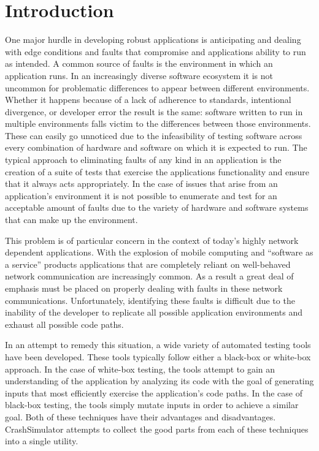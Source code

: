 \section{Introduction}

    One major hurdle in developing robust applications is anticipating and dealing with edge conditions and faults that
    compromise and applications ability to run as intended. A common source of faults is the environment in which an
    application runs. In an increasingly diverse software ecosystem it is not uncommon for problematic differences to
    appear between different environments. Whether it happens because of a lack of adherence to standards, intentional
    divergence, or developer error the result is the same: software written to run in multiple environments falls victim
    to the differences between those environments. These can easily go unnoticed due to the infeasibility of testing
    software across every combination of hardware and software on which it is expected to run. The typical approach to
    eliminating faults of any kind in an application is the creation of a suite of tests that exercise the applications
    functionality and ensure that it always acts appropriately. In the case of issues that arise from an application's
    environment it is not possible to enumerate and test for an acceptable amount of faults due to the variety of
    hardware and software systems that can make up the environment.

    This problem is of particular concern in the context of today's highly network dependent applications. With the
    explosion of mobile computing and ``software as a service'' products applications that are completely reliant on
    well-behaved network communication are increasingly common. As a result a great deal of emphasis must be placed on
    properly dealing with faults in these network communications. Unfortunately, identifying these faults is difficult
    due to the inability of the developer to replicate all possible application environments and exhaust all possible
    code paths.

    In an attempt to remedy this situation, a wide variety of automated testing tools have been developed. These tools
    typically follow either a black-box or white-box approach. In the case of white-box testing, the tools attempt to
    gain an understanding of the application by analyzing its code with the goal of generating inputs that most
    efficiently exercise the application's code paths. In the case of black-box testing, the tools simply mutate inputs
    in order to achieve a similar goal. Both of these techniques have their advantages and disadvantages. CrashSimulator
    attempts to collect the good parts from each of these techniques into a single utility.


